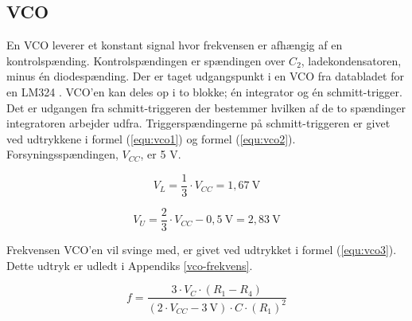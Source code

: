 \subsection*{VCO}
\label{volumenkontrol-design-vco}

En VCO leverer et konstant signal hvor frekvensen er afhængig af en kontrolspænding. Kontrolspændingen er spændingen over $C_2$, ladekondensatoren, minus én diodespænding. Der er taget udgangspunkt i en VCO fra databladet for en LM324 \cite{lm324-datablad}. VCO'en kan deles op i to blokke; én integrator og én schmitt-trigger. Det er udgangen fra schmitt-triggeren der bestemmer hvilken af de to spændinger integratoren arbejder udfra. Triggerspændingerne på schmitt-triggeren er givet ved udtrykkene i formel (\ref{equ:vco1}) og formel (\ref{equ:vco2}). Forsyningsspændingen, $V_{CC}$, er 5 V.

\begin{equation}
\label{equ:vco1}
V_L = \frac{1}{3} \cdot V_{CC} = 1,67~\mathrm{V}
\end{equation}

\begin{equation}
\label{equ:vco2}
V_U = \frac{2}{3} \cdot V_{CC} - 0,5~\mathrm{V} = 2,83~\mathrm{V}
\end{equation}

Frekvensen VCO'en vil svinge med, er givet ved udtrykket i formel (\ref{equ:vco3}). Dette udtryk er udledt i Appendiks \ref{vco-frekvens}.

\begin{equation}
\label{equ:vco3}
f = \frac{3 \cdot V_C \cdot (R_1 - R_4)}{(2 \cdot V_{CC} - 3~\mathrm{V}) \cdot C \cdot (R_1)^2}
\end{equation}


